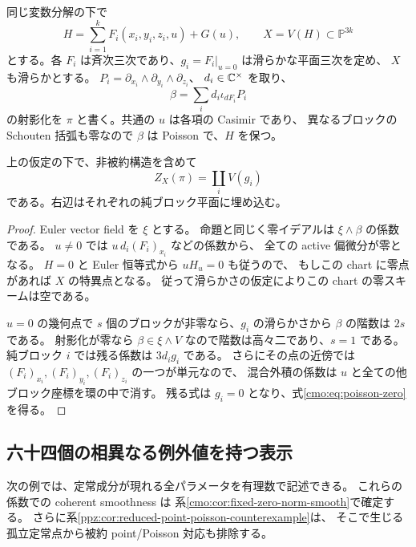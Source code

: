 同じ変数分解の下で
\[
 H=\sum_{i=1}^kF_i(x_i,y_i,z_i,u)+G(u),\qquad
 X=V(H)\subset\mathbb P^{3k}
\]
とする。各 $F_i$ は斉次三次であり、$g_i=F_i|_{u=0}$ は滑らかな平面三次を定め、
$X$ も滑らかとする。
$P_i=\partial_{x_i}\wedge\partial_{y_i}\wedge\partial_{z_i}$、
$d_i\in\mathbb C^\times$ を取り、
\[
 \beta=\sum_i d_i\iota_{dF_i}P_i
\]
の射影化を $\pi$ と書く。共通の $u$ は各項の Casimir であり、
異なるブロックの Schouten 括弧も零なので $\beta$ は Poisson で、$H$ を保つ。

\begin{proposition}
\label{cmo:prop:poisson-zero}
上の仮定の下で、非被約構造を含めて
\begin{equation}\label{cmo:eq:poisson-zero}
 Z_X(\pi)=\coprod_iV(g_i)
\end{equation}
である。右辺はそれぞれの純ブロック平面に埋め込む。
\end{proposition}
\begin{proof}
Euler vector field を $\xi$ とする。
命題と同じく零イデアルは $\xi\wedge\beta$ の係数である。
$u\ne0$ では $u\,d_i(F_i)_{x_i}$ などの係数から、
全ての active 偏微分が零となる。
$H=0$ と Euler 恒等式から $uH_u=0$ も従うので、
もしこの chart に零点があれば $X$ の特異点となる。
従って滑らかさの仮定によりこの chart の零スキームは空である。

$u=0$ の幾何点で $s$ 個のブロックが非零なら、$g_i$ の滑らかさから
$\beta$ の階数は $2s$ である。
射影化が零なら $\beta\in\xi\wedge V$ なので階数は高々二であり、$s=1$ である。
純ブロック $i$ では残る係数は $3d_i g_i$ である。
さらにその点の近傍では $(F_i)_{x_i},(F_i)_{y_i},(F_i)_{z_i}$ の一つが単元なので、
混合外積の係数は $u$ と全ての他ブロック座標を環の中で消す。
残る式は $g_i=0$ となり、式\eqref{cmo:eq:poisson-zero}を得る。
\end{proof}

\subsection{六十四個の相異なる例外値を持つ表示}

次の例では、定常成分が現れる全パラメータを有理数で記述できる。
これらの係数での coherent smoothness は
系\ref{cmo:cor:fixed-zero-norm-smooth}で確定する。
さらに系\ref{ppz:cor:reduced-point-poisson-counterexample}は、
そこで生じる孤立定常点から被約 point/Poisson 対応も排除する。


